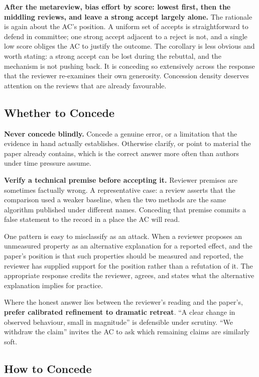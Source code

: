 \textbf{After the metareview, bias effort by score: lowest first, then the middling reviews, and leave a strong accept largely alone.}
The rationale is again about the AC's position.
A uniform set of accepts is straightforward to defend in committee; one strong accept adjacent to a reject is not, and a single low score obliges the AC to justify the outcome.
The corollary is less obvious and worth stating: a strong accept can be lost during the rebuttal, and the mechanism is not pushing back.
It is conceding so extensively across the response that the reviewer re-examines their own generosity.
Concession density deserves attention on the reviews that are already favourable.

\subsection*{Whether to Concede}

\textbf{Never concede blindly.}
Concede a genuine error, or a limitation that the evidence in hand actually establishes.
Otherwise clarify, or point to material the paper already contains, which is the correct answer more often than authors under time pressure assume.

\textbf{Verify a technical premise before accepting it.}
Reviewer premises are sometimes factually wrong.
A representative case: a review asserts that the comparison used a weaker baseline, when the two methods are the same algorithm published under different names.
Conceding that premise commits a false statement to the record in a place the AC will read.

One pattern is easy to misclassify as an attack.
When a reviewer proposes an unmeasured property as an alternative explanation for a reported effect, and the paper's position is that such properties should be measured and reported, the reviewer has supplied support for the position rather than a refutation of it.
The appropriate response credits the reviewer, agrees, and states what the alternative explanation implies for practice.

Where the honest answer lies between the reviewer's reading and the paper's, \textbf{prefer calibrated refinement to dramatic retreat}.
``A clear change in observed behaviour, small in magnitude'' is defensible under scrutiny.
``We withdraw the claim'' invites the AC to ask which remaining claims are similarly soft.

\subsection*{How to Concede}

